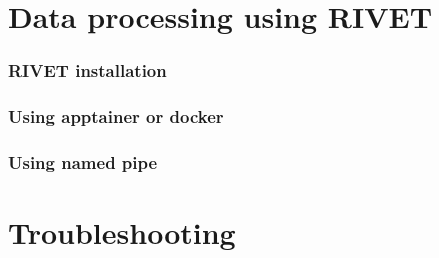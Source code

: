 \documentclass{beamer}
\begin{document}
\section{Data processing using RIVET}

\begin{frame}
 \frametitle{RIVET installation}
\end{frame}

\begin{frame}
 \frametitle{Using apptainer or docker}
\end{frame}


\begin{frame}
 \frametitle{Using named pipe}
\end{frame}


\section{Troubleshooting}
\end{document}
